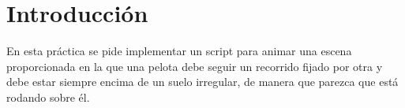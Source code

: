 \section{Introducción}

En esta práctica se pide implementar un script para animar una escena proporcionada en la que una pelota debe seguir un recorrido fijado por otra y debe estar siempre encima de un suelo irregular, de manera que parezca que está rodando sobre él.